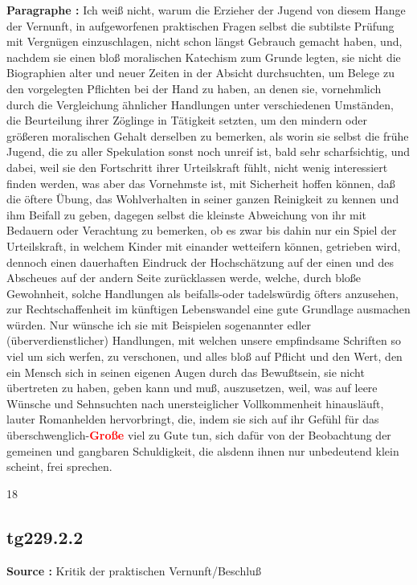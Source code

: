 \documentclass[a4paper,12pt,twoside]{book}
\newcommand{\match}[1]{\textcolor{red}{\textbf{#1}}}
\begin{document}
	\textbf{Paragraphe : }Ich weiß nicht, warum die Erzieher der Jugend von diesem Hange der Vernunft, in aufgeworfenen praktischen Fragen selbst die subtilste Prüfung mit Vergnügen einzuschlagen, nicht schon längst Gebrauch gemacht haben, und, nachdem sie einen bloß moralischen Katechism zum Grunde legten, sie nicht die Biographien alter und neuer Zeiten in  der Absicht durchsuchten, um Belege zu den vorgelegten Pflichten bei der Hand zu haben, an denen sie, vornehmlich durch die Vergleichung ähnlicher Handlungen unter verschiedenen Umständen, die Beurteilung ihrer Zöglinge in Tätigkeit setzten, um den mindern oder größeren moralischen Gehalt derselben zu bemerken, als worin sie selbst die frühe Jugend, die zu aller Spekulation sonst noch unreif ist, bald sehr scharfsichtig, und dabei, weil sie den Fortschritt ihrer Urteilskraft fühlt, nicht wenig interessiert finden werden, was aber das Vornehmste ist, mit Sicherheit hoffen können, daß die öftere Übung, das Wohlverhalten in seiner ganzen Reinigkeit zu kennen und ihm Beifall zu geben, dagegen selbst die kleinste Abweichung von ihr mit Bedauern oder Verachtung zu bemerken, ob es zwar bis dahin nur ein Spiel der Urteilskraft, in welchem Kinder mit einander wetteifern können, getrieben wird, dennoch einen dauerhaften Eindruck der Hochschätzung auf der einen und des Abscheues auf der andern Seite zurücklassen werde, welche, durch bloße Gewohnheit, solche Handlungen als beifalls-oder tadelswürdig öfters anzusehen, zur Rechtschaffenheit im künftigen Lebenswandel eine gute Grundlage ausmachen würden. Nur wünsche ich sie mit Beispielen sogenannter edler (überverdienstlicher) Handlungen, mit welchen unsere empfindsame Schriften so viel um sich werfen, zu verschonen, und alles bloß auf Pflicht und den Wert, den ein Mensch sich in seinen eigenen Augen durch das Bewußtsein, sie nicht übertreten zu haben, geben kann und muß, auszusetzen, weil, was auf leere Wünsche und Sehnsuchten nach unersteiglicher Vollkommenheit hinausläuft, lauter Romanhelden hervorbringt, die, indem sie sich auf ihr Gefühl für das überschwenglich-\match{Große} viel zu Gute tun, sich dafür von der Beobachtung der gemeinen und gangbaren Schuldigkeit, die alsdenn ihnen nur unbedeutend klein scheint, frei sprechen.
	
	
	18
	
	
	
	\subsection*{tg229.2.2} 
	\textbf{Source : }Kritik der praktischen Vernunft/Beschluß\\  
	
\end{document}

